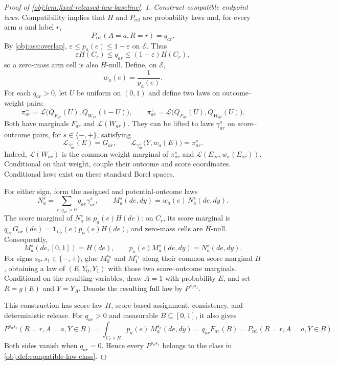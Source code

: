 \documentclass[11pt]{article}
\begin{document}
\begin{proof}[Proof of \cref{obj:lem:fixed-released-law-baseline}]
\noindent\emph{1. Construct compatible endpoint laws.}
Compatibility implies that \(H\) and \(P_{\mathrm{rel}}\) are probability laws and, for every arm \(a\) and label \(r\),
\[
P_{\mathrm{rel}}(A=a,R=r)=q_{ar}.
\]
By \cref{obj:ass:overlap}, \(\varepsilon\le p_a(e)\le 1-\varepsilon\) on \(\mathcal E\). Thus
\[
\varepsilon H(C_r)\le q_{ar}\le(1-\varepsilon)H(C_r),
\]
so a zero-mass arm cell is also \(H\)-null. Define, on \(\mathcal E\),
\[
w_a(e)=\frac{1}{p_a(e)}.
\]
For each \(q_{ar}>0\), let \(U\) be uniform on \((0,1)\) and define two laws on outcome–weight pairs:
\[
\pi_{ar}^{-}
=\mathcal L\bigl(Q_{F_{ar}}(U),Q_{W_{ar}}(1-U)\bigr),
\qquad
\pi_{ar}^{+}
=\mathcal L\bigl(Q_{F_{ar}}(U),Q_{W_{ar}}(U)\bigr).
\]
Both have marginals \(F_{ar}\) and \(\mathcal L(W_{ar})\). They can be lifted to laws \(\gamma_{ar}^{s}\) on score–outcome pairs, for \(s\in\{-,+\}\), satisfying
\[
\mathcal L_{\gamma_{ar}^{s}}(E)=G_{ar},
\qquad
\mathcal L_{\gamma_{ar}^{s}}\bigl(Y,w_a(E)\bigr)=\pi_{ar}^{s}.
\]
Indeed, \(\mathcal L(W_{ar})\) is the common weight marginal of \(\pi_{ar}^{s}\) and \(\mathcal L(E_{ar},w_a(E_{ar}))\). Conditional on that weight, couple their outcome and score coordinates. Conditional laws exist on these standard Borel spaces.

For either sign, form the assigned and potential-outcome laws
\[
N_a^{s}=\sum_{r:q_{ar}>0}q_{ar}\gamma_{ar}^{s},
\qquad
M_a^{s}(de,dy)=w_a(e)\,N_a^{s}(de,dy).
\]
The score marginal of \(N_a^{s}\) is \(p_a(e)H(de)\): on \(C_r\), its score marginal is \(q_{ar}G_{ar}(de)=\mathbf1_{C_r}(e)p_a(e)H(de)\), and zero-mass cells are \(H\)-null. Consequently,
\[
M_a^{s}(de,[0,1])=H(de),
\qquad
p_a(e)M_a^{s}(de,dy)=N_a^{s}(de,dy).
\]
For signs \(s_0,s_1\in\{-,+\}\), glue \(M_0^{s_0}\) and \(M_1^{s_1}\) along their common score marginal \(H\), obtaining a law of \((E,Y_0,Y_1)\) with those two score–outcome marginals. Conditional on the resulting variables, draw \(A=1\) with probability \(E\), and set \(R=g(E)\) and \(Y=Y_A\). Denote the resulting full law by \(P^{s_0s_1}\).

This construction has score law \(H\), score-based assignment, consistency, and deterministic release. For \(q_{ar}>0\) and measurable \(B\subseteq[0,1]\), it also gives
\[
P^{s_0s_1}(R=r,A=a,Y\in B)
=\int_{C_r\times B}p_a(e)\,M_a^{s_a}(de,dy)
=q_{ar}F_{ar}(B)
=P_{\mathrm{rel}}(R=r,A=a,Y\in B).
\]
Both sides vanish when \(q_{ar}=0\). Hence every \(P^{s_0s_1}\) belongs to the class in \cref{obj:def:compatible-law-class}. %


\end{proof}
\end{document}

